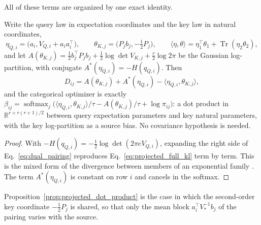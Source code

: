 \documentclass[twoside,11pt]{article}
\newcommand{\softmax}{\operatorname{softmax}}
\begin{document}
All of these terms are organized by one exact identity.
\begin{theorem}
\label{thm:dual_coordinates}
Write the query law in expectation coordinates and the key law in natural coordinates,
\begin{equation}
\eta_{Q,i}=\bigl(a_i,V_{Q,i}+a_ia_i^\top\bigr),\qquad
\theta_{K,j}=\bigl(P_jb_j,-\tfrac12P_j\bigr),\qquad
\langle\eta,\theta\rangle=\eta_1^\top\theta_1+\operatorname{Tr}(\eta_2\theta_2),
\end{equation}
and let $A(\theta_{K,j})=\tfrac12b_j^\top P_jb_j+\tfrac12\log\det V_{K,j}+\tfrac r2\log2\pi$ be the Gaussian log-partition, with conjugate $A^*(\eta_{Q,i})=-H(q_{Q,i})$. Then
\begin{equation}
D_{ij}=A(\theta_{K,j})+A^*(\eta_{Q,i})-\langle\eta_{Q,i},\theta_{K,j}\rangle,
\label{eq:dual_pairing}
\end{equation}
and the categorical optimizer is exactly $\beta_{ij}=\softmax_j\bigl(\langle\eta_{Q,i},\theta_{K,j}\rangle/\tau-A(\theta_{K,j})/\tau+\log\pi_{ij}\bigr)$: a dot product in $\mathbb R^{r+r(r+1)/2}$ between query expectation parameters and key natural parameters, with the key log-partition as a source bias. No covariance hypothesis is needed.
\end{theorem}
\begin{proof}
With $-H(q_{Q,i})=-\tfrac12\log\det(2\pi eV_{Q,i})$, expanding the right side of Eq.~\eqref{eq:dual_pairing} reproduces Eq.~\eqref{eq:projected_full_kl} term by term. This is the mixed form of the divergence between members of an exponential family \citep[Sec.~5.2, Eq.~(5.11)]{Wainwright2008}. The term $A^*(\eta_{Q,i})$ is constant on row $i$ and cancels in the softmax.
\end{proof}
Proposition~\ref{prop:projected_dot_product} is the case in which the second-order key coordinate $-\tfrac12P_j$ is shared, so that only the mean block $a_i^\top V_*^{-1}b_j$ of the pairing varies with the source.
\end{document}
